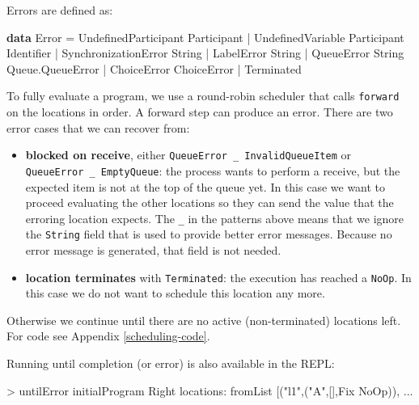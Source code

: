 \documentclass[runningheads,plain]{llncs}
\newenvironment{Shaded}{}{}
\newcommand{\KeywordTok}[1]{\textcolor[rgb]{0.00,0.44,0.13}{\textbf{#1}}}
\newcommand{\DataTypeTok}[1]{\textcolor[rgb]{0.56,0.13,0.00}{#1}}
\newcommand{\StringTok}[1]{\textcolor[rgb]{0.25,0.44,0.63}{#1}}
\newcommand{\FunctionTok}[1]{\textcolor[rgb]{0.02,0.16,0.49}{#1}}
\newcommand{\NormalTok}[1]{#1}
\begin{document}
Errors are defined as:

\begin{Shaded}
\begin{Highlighting}[]
\KeywordTok{data} \DataTypeTok{Error} 
    \FunctionTok{=} \DataTypeTok{UndefinedParticipant} \DataTypeTok{Participant}
    \FunctionTok{|} \DataTypeTok{UndefinedVariable} \DataTypeTok{Participant} \DataTypeTok{Identifier}
    \FunctionTok{|} \DataTypeTok{SynchronizationError} \DataTypeTok{String}
    \FunctionTok{|} \DataTypeTok{LabelError} \DataTypeTok{String}
    \FunctionTok{|} \DataTypeTok{QueueError} \DataTypeTok{String} \DataTypeTok{Queue.QueueError}
    \FunctionTok{|} \DataTypeTok{ChoiceError} \DataTypeTok{ChoiceError}
    \FunctionTok{|} \DataTypeTok{Terminated}
\end{Highlighting}
\end{Shaded}

To fully evaluate a program, we use a round-robin scheduler that calls
\texttt{forward} on the locations in order. A forward step can produce
an error. There are two error cases that we can recover from:

\begin{itemize}
\item
  \textbf{blocked on receive}, either
  \texttt{QueueError\ \_\ InvalidQueueItem} or
  \texttt{QueueError\ \_\ EmptyQueue}: the process wants to perform a
  receive, but the expected item is not at the top of the queue yet. In
  this case we want to proceed evaluating the other locations so they
  can send the value that the erroring location expects. The \texttt{\_}
  in the patterns above means that we ignore the \texttt{String} field
  that is used to provide better error messages. Because no error
  message is generated, that field is not needed.
\item
  \textbf{location terminates} with \texttt{Terminated}: the execution
  has reached a \texttt{NoOp}. In this case we do not want to schedule
  this location any more.
\end{itemize}

Otherwise we continue until there are no active (non-terminated)
locations left. For code see Appendix \ref{scheduling-code}.

Running until completion (or error) is also available in the REPL:

\begin{Shaded}
\begin{Highlighting}[]
\FunctionTok{>}\NormalTok{ untilError initialProgram}
\DataTypeTok{Right}\NormalTok{ locations}\FunctionTok{:}\NormalTok{ fromList [(}\StringTok{"l1"}\NormalTok{,(}\StringTok{"A"}\NormalTok{,[],}\DataTypeTok{Fix} \DataTypeTok{NoOp}\NormalTok{)), }\FunctionTok{...} 
\end{Highlighting}
\end{Shaded}
\end{document}
